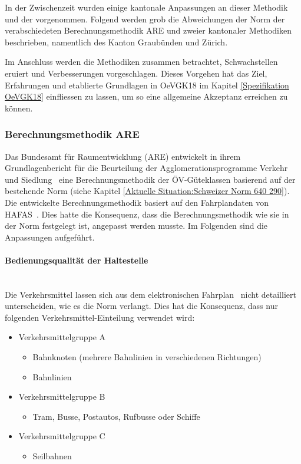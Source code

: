 In der Zwischenzeit wurden einige kantonale Anpassungen an dieser Methodik und der  vorgenommen.
Folgend werden grob die Abweichungen der Norm der verabschiedeten Berechnungsmethodik ARE und zweier kantonaler Methodiken beschrieben, namentlich des Kanton Graubünden und Zürich.

Im Anschluss werden die Methodiken zusammen betrachtet, Schwachstellen eruiert und Verbesserungen vorgeschlagen.
Dieses Vorgehen hat das Ziel, Erfahrungen und etablierte Grundlagen in \gls{OeVGK18} im Kapitel \ref{Spezifikation OeVGK18} einfliessen zu lassen, um so eine allgemeine Akzeptanz erreichen zu können.

\subsubsection{Berechnungsmethodik ARE}
\label{Lösungsansätze:Berechnungsmethodik ARE}
Das Bundesamt für Raumentwicklung (ARE) entwickelt in ihrem Grundlagenbericht für die Beurteilung der Agglomerationsprogramme Verkehr und Siedlung~\cite{berechnung_are} eine Berechnungsmethodik der \acs{ÖV}-Güteklassen basierend auf der bestehende Norm (siehe Kapitel \ref{Aktuelle Situation:Schweizer Norm 640 290}).
Die entwickelte Berechnungsmethodik basiert auf den Fahrplandaten von HAFAS~\cite{sbb_hafas_spec}.
Dies hatte die Konsequenz, dass die Berechnungsmethodik wie sie in der Norm festgelegt ist, angepasst werden musste.
Im Folgenden sind die Anpassungen aufgeführt.

\paragraph{Bedienungsqualität der Haltestelle}~\\
\label{Berechnungsmethodik ARE:Bedienungsqualität der Haltestelle}
Die Verkehrsmittel lassen sich aus dem elektronischen Fahrplan~\cite{sbb_hafas_spec} nicht detailliert unterscheiden, wie es die Norm verlangt.
Dies hat die Konsequenz, dass nur folgenden Verkehrsmittel-Einteilung verwendet wird:

\begin{itemize}[noitemsep]
    \item Verkehrsmittelgruppe A
    \begin{itemize}
        \item Bahnknoten (mehrere Bahnlinien in verschiedenen Richtungen)
        \item Bahnlinien
    \end{itemize}
    \item Verkehrsmittelgruppe B
    \begin{itemize}
        \item Tram, Busse, Postautos, Rufbusse oder Schiffe
    \end{itemize}
    \item Verkehrsmittelgruppe C
    \begin{itemize}
        \item Seilbahnen
    \end{itemize}
\end{itemize}


